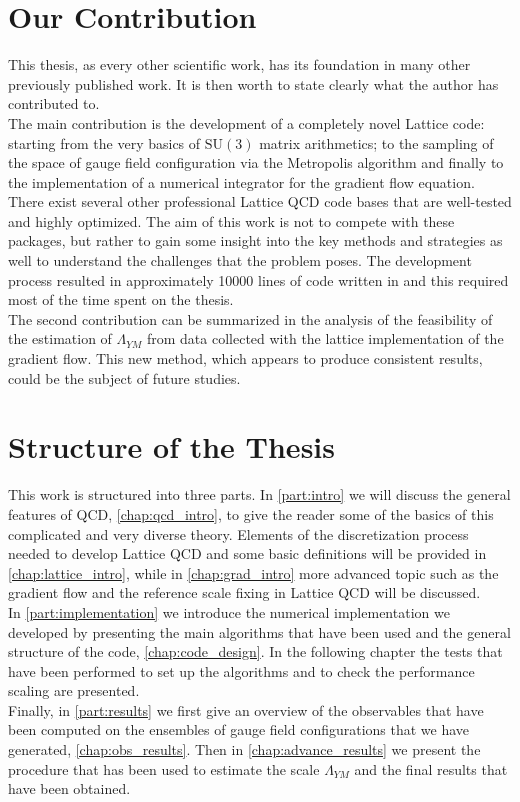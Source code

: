 \section{Our Contribution}
This thesis, as every other scientific work, has its foundation in many other previously published work. It is then worth to state clearly what the author has contributed to. \\
The main contribution is the development of a completely novel Lattice code: starting from the very basics of $\mathrm{SU}(3)$ matrix arithmetics; to the sampling of the space of gauge field configuration via the Metropolis algorithm and finally to the implementation of a numerical integrator for the gradient flow equation. \\
There exist several other professional Lattice QCD code bases that are well-tested and highly optimized. The aim of this work is not to compete with these packages, but rather to gain some insight into the key methods and strategies as well to understand the challenges that the problem poses. The development process resulted in approximately 10000 lines of code written in \cpp and this required most of the time spent on the thesis.\\
The second contribution can be summarized in the analysis of the feasibility of the estimation of $\Lambda_{YM}$ from data collected with the lattice implementation of the gradient flow. This new method, which appears to produce consistent results, could be the subject of future studies. 


\section{Structure of the Thesis}
This work is structured into three parts. In \cref{part:intro} we will discuss the general features of QCD, \cref{chap:qcd_intro}, to give the reader some of the basics of this complicated and very diverse theory. Elements of the discretization process needed to develop Lattice QCD and some basic definitions will be provided in \cref{chap:lattice_intro}, while in \cref{chap:grad_intro} more advanced topic such as the gradient flow and the reference scale fixing in Lattice QCD will be discussed.  \\
In \cref{part:implementation} we introduce the numerical implementation we developed by presenting the main algorithms that have been used and the general structure of the code, \cref{chap:code_design}. In the following chapter the tests that have been performed to set up the algorithms and to check the performance scaling are presented.\\
Finally, in \cref{part:results} we first give an overview of the observables that have been computed on the ensembles of gauge field configurations that we have generated, \cref{chap:obs_results}. Then  in \cref{chap:advance_results} we present the procedure that has been used to estimate the scale $\Lambda_{YM}$ and the final results that have been obtained. 